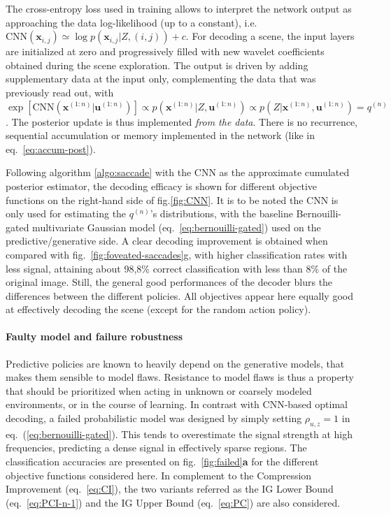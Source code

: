 \documentclass[12pt,twoside,openright]{article}
\begin{document}
The cross-entropy loss used in training {\color{Purple} allows to interpret} the network output as {\color{Purple} approaching} the data log-likelihood {\color{Purple}(up to a constant), i.e. $\text{CNN}(\boldsymbol{x}_{i,j}) \simeq \log p(\boldsymbol{x}_{i,j}|Z,(i,j)) + c$}. For decoding a scene, the input layers are initialized at zero  and progressively filled with new wavelet coefficients {\color{Purple} obtained during the scene exploration}.
The output is driven by adding supplementary data at the input only, complementing the data that was previously read out, {\color{Purple} with $\exp \left[\text{CNN}(\boldsymbol{x}^{(1:n)}|\boldsymbol{u}^{(1:n)})\right] \propto p(\boldsymbol{x}^{(1:n)}|Z,\boldsymbol{u}^{(1:n)}) \propto p(Z|\boldsymbol{x}^{(1:n)},\boldsymbol{u}^{(1:n)}) = q^{(n)}$.} The posterior update is thus implemented \emph{from the data}. There is no recurrence, sequential accumulation or memory implemented in the network (like in eq.~\ref{eq:accum-post}). %


Following algorithm \ref{algo:saccade} with the CNN as the {\color{Purple} approximate cumulated posterior estimator}, the decoding efficacy is shown for different objective functions on the right-hand side of fig.\ref{fig:CNN}. {\color{Purple} It is to be noted the CNN is only used for estimating the $q^{(n)}$'s distributions, with the baseline Bernouilli-gated multivariate Gaussian model (eq.~\ref{eq:bernouilli-gated}) used on the predictive/generative side}. A clear decoding improvement is obtained {\color{Purple} when compared with fig.~\ref{fig:foveated-saccades}g}, with higher classification rates with less signal, attaining about 98,8\% correct classification with less than 8\% of the original image. Still, the general good performances of the decoder blurs the differences between the different policies. All objectives appear here equally good at effectively decoding the scene {\color{Purple} (except for the random action policy)}. 

\paragraph{Faulty model and failure robustness}
Predictive policies {\color{Purple}are known to heavily depend} on the generative models, that makes them sensible to model flaws. Resistance to model flaws is thus a property that should be prioritized when acting in unknown or coarsely modeled environments, or in the course of learning. In contrast with CNN-based optimal decoding, a failed probabilistic model was designed by simply setting $\rho_{u,z} = 1$ in eq.~(\ref{eq:bernouilli-gated}).  This tends to overestimate the signal strength at high frequencies, predicting a dense signal in effectively sparse regions. The classification accuracies are presented on fig.~\ref{fig:failed}\textbf{a} for the different objective functions considered here. In complement to the Compression Improvement (eq.~\ref{eq:CI}), the two variants referred as the IG Lower Bound (eq.~\ref{eq:PCI-n-1}) and the IG Upper Bound (eq.~\ref{eq:PC}) are also considered. 
\end{document}

